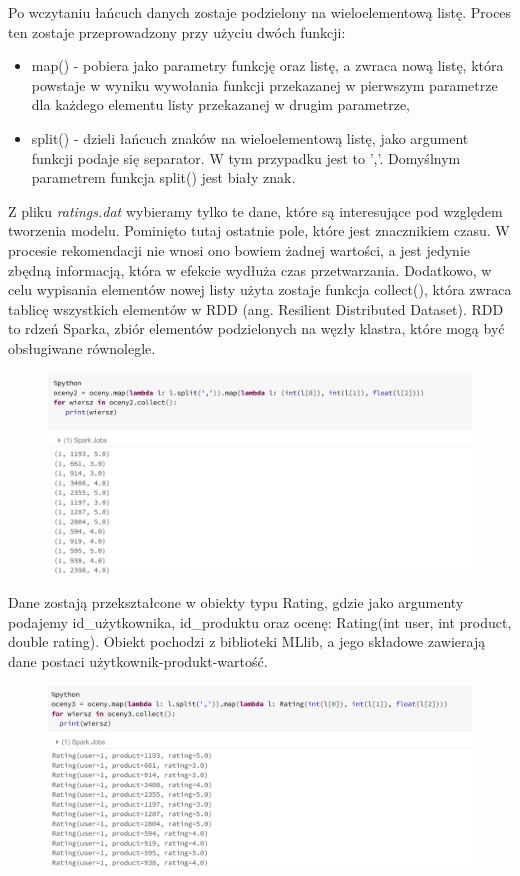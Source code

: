 \documentclass[12pt,a4paper]{report}
\begin{document}
Po wczytaniu łańcuch danych zostaje podzielony na wieloelementową listę. Proces ten zostaje przeprowadzony przy użyciu dwóch funkcji:
\begin{itemize}
\item map() - pobiera jako parametry funkcję oraz listę, a zwraca nową listę, która powstaje w wyniku wywołania funkcji przekazanej w pierwszym parametrze dla każdego elementu listy przekazanej w drugim parametrze,
\item split() - dzieli łańcuch znaków na wieloelementową listę, jako argument funkcji podaje się separator. W tym przypadku jest to ','. Domyślnym parametrem funkcja split() jest biały znak.
\end{itemize}
Z pliku \textit{ratings.dat} wybieramy tylko te dane, które są interesujące pod względem tworzenia modelu. Pominięto tutaj ostatnie pole, które jest znacznikiem czasu. W procesie rekomendacji nie wnosi ono bowiem żadnej wartości, a jest jedynie zbędną informacją, która w efekcie wydłuża czas przetwarzania.
Dodatkowo, w celu wypisania elementów nowej listy użyta zostaje funkcja collect(), która zwraca tablicę wszystkich elementów w RDD (ang. Resilient Distributed Dataset). RDD to rdzeń Sparka,  zbiór elementów podzielonych na węzły klastra, które mogą być obsługiwane równolegle.

\begin{figure}[H]
\includegraphics[scale=0.5]{obrazy/ALS3.PNG} 
\end{figure}

Dane zostają przekształcone w obiekty typu Rating, gdzie jako argumenty podajemy id\_użytkownika, id\_produktu oraz ocenę: Rating(int user, int product, double rating). Obiekt pochodzi z biblioteki MLlib, a jego składowe zawierają dane postaci użytkownik-produkt-wartość.

\begin{figure}[H]
\includegraphics[scale=0.5]{obrazy/ALS4.PNG} 
\end{figure}
\end{document}
